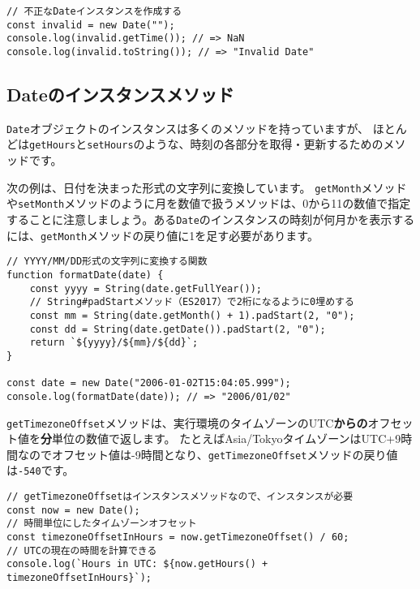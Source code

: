 \begin{lstlisting}
// 不正なDateインスタンスを作成する
const invalid = new Date("");
console.log(invalid.getTime()); // => NaN
console.log(invalid.toString()); // => "Invalid Date"
\end{lstlisting}

\hypertarget{instance-method}{%
\subsection{Dateのインスタンスメソッド}\label{instance-method}}

\texttt{Date}オブジェクトのインスタンスは多くのメソッドを持っていますが、
ほとんどは\texttt{getHours}と\texttt{setHours}のような、時刻の各部分を取得・更新するためのメソッドです。

次の例は、日付を決まった形式の文字列に変換しています。
\texttt{getMonth}メソッドや\texttt{setMonth}メソッドのように月を数値で扱うメソッドは、0から11の数値で指定することに注意しましょう。ある\texttt{Date}のインスタンスの時刻が何月かを表示するには、\texttt{getMonth}メソッドの戻り値に1を足す必要があります。

\begin{lstlisting}
// YYYY/MM/DD形式の文字列に変換する関数
function formatDate(date) {
    const yyyy = String(date.getFullYear());
    // String#padStartメソッド（ES2017）で2桁になるように0埋めする
    const mm = String(date.getMonth() + 1).padStart(2, "0");
    const dd = String(date.getDate()).padStart(2, "0");
    return `${yyyy}/${mm}/${dd}`;
}

const date = new Date("2006-01-02T15:04:05.999");
console.log(formatDate(date)); // => "2006/01/02"
\end{lstlisting}

\texttt{getTimezoneOffset}メソッドは、実行環境のタイムゾーンのUTC\textbf{からの}オフセット値を\textbf{分}単位の数値で返します。
たとえばAsia/TokyoタイムゾーンはUTC+9時間なのでオフセット値は-9時間となり、\texttt{getTimezoneOffset}メソッドの戻り値は\texttt{-540}です。

\begin{lstlisting}
// getTimezoneOffsetはインスタンスメソッドなので、インスタンスが必要
const now = new Date();
// 時間単位にしたタイムゾーンオフセット
const timezoneOffsetInHours = now.getTimezoneOffset() / 60;
// UTCの現在の時間を計算できる
console.log(`Hours in UTC: ${now.getHours() + timezoneOffsetInHours}`);
\end{lstlisting}

